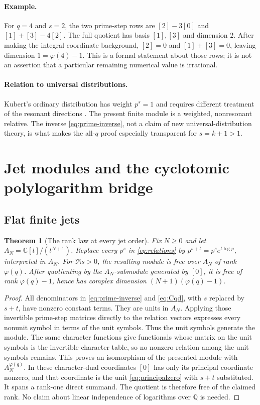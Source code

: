\documentclass[11pt]{article}
\newtheorem{theorem}{Theorem}[section]
\theoremstyle{definition}
\theoremstyle{remark}
\newcommand{\CC}{\mathbb C}
\newcommand{\QQ}{\mathbb Q}
\begin{document}
\paragraph{Example.}
For $q=4$ and $s=2$, the two prime-step rows are
$[2]-3[0]$ and $[1]+[3]-4[2]$. The full quotient has basis $[1],[3]$ and dimension $2$. After making the integral coordinate background, $[2]=0$ and $[1]+[3]=0$, leaving dimension $1=\varphi(4)-1$. This is a formal statement about those rows; it is not an assertion that a particular remaining numerical value is irrational.

\paragraph{Relation to universal distributions.}
Kubert's ordinary distribution has weight $p^s=1$ and requires different treatment of the resonant directions \cite{Kubert}. The present finite module is a weighted, nonresonant relative. The inverse \eqref{eq:prime-inverse}, not a claim of new universal-distribution theory, is what makes the all-$q$ proof especially transparent for $s=k+1>1$.

\section{Jet modules and the cyclotomic polylogarithm bridge}
\label{sec:jets}

\subsection{Flat finite jets}
\begin{theorem}[The rank law at every jet order]\label{thm:jetmodule}
Fix $N\geq0$ and let $A_N=\CC[t]/(t^{N+1})$. Replace every $p^s$ in \eqref{eq:relations} by $p^{s+t}=p^s e^{t\log p}$, interpreted in $A_N$. For $\Re s>0$, the resulting module is free over $A_N$ of rank $\varphi(q)$. After quotienting by the $A_N$-submodule generated by $[0]$, it is free of rank $\varphi(q)-1$, hence has complex dimension $(N+1)(\varphi(q)-1)$.
\end{theorem}
\begin{proof}
All denominators in \eqref{eq:prime-inverse} and \eqref{eq:Cqd}, with $s$ replaced by $s+t$, have nonzero constant terms. They are units in $A_N$. Applying those invertible prime-step matrices directly to the relation vectors expresses every nonunit symbol in terms of the unit symbols. Thus the unit symbols generate the module. The same character functions give functionals whose matrix on the unit symbols is the invertible character table, so no nonzero relation among the unit symbols remains. This proves an isomorphism of the presented module with $A_N^{\varphi(q)}$. In these character-dual coordinates $[0]$ has only its principal coordinate nonzero, and that coordinate is the unit \eqref{eq:principalzero} with $s+t$ substituted. It spans a rank-one direct summand. The quotient is therefore free of the claimed rank. No claim about linear independence of logarithms over $\QQ$ is needed.
\end{proof}
\end{document}
